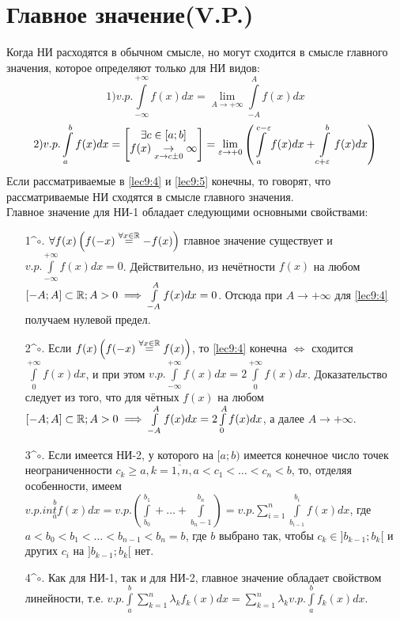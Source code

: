 \documentclass[../../main.tex]{subfiles}
\begin{document}
\section{Главное значение(V.P.)}
Когда НИ расходятся в обычном смысле, но могут сходится в смысле главного
значения, которое определяют только для НИ видов:
\begin{equation}
\label{lec9:4} 1) v.p. 
\int\limits_{-\infty}^{+\infty} f(x) dx = 
\lim\limits_{A \to +\infty} \int\limits_{-A}^A f(x)dx
\end{equation}
\begin{equation}
\label{lec9:5} 2) v.p.
\int\limits_a^b f(x) dx = \begin{bmatrix}
	\exists c \in \left[a; b\right]\\
	f(x) \underset{x \to c \pm 0}{\to} \infty
\end{bmatrix} =
\lim\limits_{\varepsilon \to +0} \left(
\int\limits_a^{c - \varepsilon} f(x) dx + 
\int\limits_{c + \varepsilon}^b f(x) dx
\right)
\end{equation}
Если рассматриваемые в \eqref{lec9:4} и \eqref{lec9:5} конечны, то
говорят, что рассматриваемые НИ сходятся в смысле главного значения.\\
Главное значение для НИ-1 обладает следующими основными свойствами:\\
\begin{enumerate}
\item[1^$\circ$.] 
$ \forall f(x) \left(f(-x) \stackrel{\forall x \in \mathbb{R}}{=} -f(x) \right) $
главное значение существует и $ v.p. \int\limits_{-\infty}^{+\infty}f(x)dx=0$.
Действительно, из нечётности $ f(x) $ на любом $ [-A; A] \subset \mathbb{R}; A > 0 
\implies \int\limits_{-A}^A f(x) dx = 0$. Отсюда при $ A \to +\infty $ для
\eqref{lec9:4} получаем нулевой предел.
\item[2^$\circ$.]
Если $ f(x) \left(f(-x) \stackrel{\forall x \in \mathbb{R}}{=} f(x) \right) $, то
\eqref{lec9:4} конечна $ \iff $ сходится $ \int\limits_0^{+\infty}f(x)dx $, и 
при этом $ v.p. \int\limits_{-\infty}^{+\infty} f(x) dx = 
2\int\limits_0^{+\infty} f(x) dx$. Доказательство следует из того, что для
чётных $ f(x) $ на любом $ [-A; A] \subset \mathbb{R}; A > 0 
\implies \int\limits_{-A}^A f(x) dx = 2\int\limits_0^A f(x) dx$, а далее 
$ A \to +\infty $.
\item[3^$\circ$.]
Если имеется НИ-2, у которого на $ [a; b) $ имеется конечное число точек
неограниченности $ c_k \geq a, k = \overline{1,n}, a < c_1 < \dots <
c_n < b $, то, отделяя особенности, имеем $ v.p. int\limits_a^b f(x) dx = 
v.p. \left(\int\limits_{b_0}^{b_1} + \dots + \int\limits_{b_n - 1}^{b_n}
\right) = v.p. \sum\limits_{i = 1}^n \int\limits_{b_{i - 1}}^{b_i} f(x)dx $,
где $ a < b_0 < b_1 < \dots < b_{n - 1} < b_n = b $, где $ b $ выбрано так, 
чтобы $ c_k \in ]b_{k - 1}; b_k[ $ и других $ c_i $ на $ ]b_{k - 1}; b_k[ $ нет.
\item[4^$\circ$.]
Как для НИ-1, так и для НИ-2, главное значение обладает свойством линейности,
т.е. $ v.p. \int\limits_a^b \sum\limits_{k = 1}^n \lambda_kf_k(x)dx =
\sum\limits_{k = 1}^n \lambda_k v.p. \int\limits_a^b f_k(x)dx$.
\end{enumerate}
\end{document}
